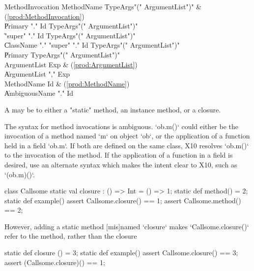 \begin{bbgrammar}
    MethodInvocation \: MethodName TypeArgs\opt \xcd"(" ArgumentList\opt \xcd")" & (\ref{prod:MethodInvocation}) \\
                     \| Primary \xcd"." Id TypeArgs\opt \xcd"(" ArgumentList\opt \xcd")" \\
                     \| \xcd"super" \xcd"." Id TypeArgs\opt \xcd"(" ArgumentList\opt \xcd")" \\
                     \| ClassName \xcd"." \xcd"super"  \xcd"." Id TypeArgs\opt \xcd"(" ArgumentList\opt \xcd")" \\
                     \| Primary TypeArgs\opt \xcd"(" ArgumentList\opt \xcd")" \\
        ArgumentList \: Exp & (\ref{prod:ArgumentList}) \\
                     \| ArgumentList \xcd"," Exp \\
          MethodName \: Id & (\ref{prod:MethodName}) \\
                     \| AmbiguousName \xcd"." Id \\
\end{bbgrammar}


A  may be to either a \xcd"static" method, an
instance method, or a closure.


The syntax for method invocations is ambiguous. \xcd`ob.m()` could either be
the invocation of a method named \xcd`m` on object \xcd`ob`, or the
application of a function held in a field \xcd`ob.m`.   If both are defined on
the same class, X10 resolves \xcd`ob.m()` to the invocation of the 
method.  If the application of a function in a field is desired, use
an alternate syntax which makes the intent clear to X10, such as
\xcd`(ob.m)()`. 

\begin{ex}
\begin{xten}
class Callsome {
  static val closure : () => Int = () => 1;
  static def method()            = 2;
  static def example() {
     assert Callsome.closure() == 1;
     assert Callsome.method()  == 2;
  } 
}
\end{xten}
However, adding a static method [mis]named \xcd`closure` makes
\xcd`Callsome.closure()` 
refer to the method, rather than the closure
\begin{xten}
  static def closure () = 3;
  static def example() {
     assert Callsome.closure() == 3;
     assert (Callsome.closure)() == 1;
  }
\end{xten}
\end{ex}


